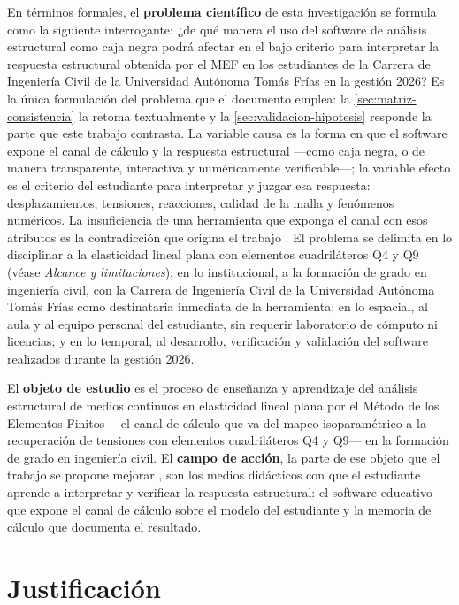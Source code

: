 En términos formales, el \textbf{problema científico} de esta investigación se formula como la siguiente interrogante: ¿de qué manera el uso del software de análisis estructural como caja negra podrá afectar en el bajo criterio para interpretar la respuesta estructural obtenida por el MEF en los estudiantes de la Carrera de Ingeniería Civil de la Universidad Autónoma Tomás Frías en la gestión 2026? Es la única formulación del problema que el documento emplea: la \autoref{sec:matriz-consistencia} la retoma textualmente y la \autoref{sec:validacion-hipotesis} responde la parte que este trabajo contrasta. La variable causa es la forma en que el software expone el canal de cálculo y la respuesta estructural —como caja negra, o de manera transparente, interactiva y numéricamente verificable—; la variable efecto es el criterio del estudiante para interpretar y juzgar esa respuesta: desplazamientos, tensiones, reacciones, calidad de la malla y fenómenos numéricos. La insuficiencia de una herramienta que exponga el canal con esos atributos es la contradicción que origina el trabajo \autocite[p.~7]{alvarez_metodologia}. El problema se delimita en lo disciplinar a la elasticidad lineal plana con elementos cuadriláteros Q4 y Q9 (véase \emph{Alcance y limitaciones}); en lo institucional, a la formación de grado en ingeniería civil, con la Carrera de Ingeniería Civil de la Universidad Autónoma Tomás Frías como destinataria inmediata de la herramienta; en lo espacial, al aula y al equipo personal del estudiante, sin requerir laboratorio de cómputo ni licencias; y en lo temporal, al desarrollo, verificación y validación del software realizados durante la gestión 2026.

El \textbf{objeto de estudio} \autocite[p.~8]{alvarez_metodologia} es el proceso de enseñanza y aprendizaje del análisis estructural de medios continuos en elasticidad lineal plana por el Método de los Elementos Finitos —el canal de cálculo que va del mapeo isoparamétrico a la recuperación de tensiones con elementos cuadriláteros Q4 y Q9— en la formación de grado en ingeniería civil. El \textbf{campo de acción}, la parte de ese objeto que el trabajo se propone mejorar \autocite[p.~13]{alvarez_metodologia}, son los medios didácticos con que el estudiante aprende a interpretar y verificar la respuesta estructural: el software educativo que expone el canal de cálculo sobre el modelo del estudiante y la memoria de cálculo que documenta el resultado.

\section*{Justificación}

